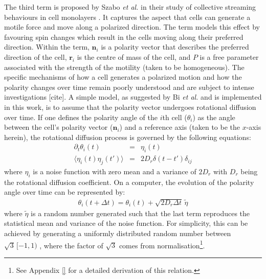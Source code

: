 \documentclass[a4paper,12pt]{article}
\begin{document}
The third term is proposed by Szabo \emph{et al.} in their study of collective streaming behaviours in cell monolayers \cite{szabo2010}. It captures the aspect that  cells can generate a motile force and move along a polarized direction. The term models this effect by favouring spin changes which result in the cells moving along their preferred direction. Within the term, $\bm{n}_i$ is a polarity vector that describes the preferred direction of the cell, $\bm{r}_i$ is the centre of mass of the cell, and $P$ is a free parameter associated with the strength of the motility (taken to be homogeneous). The specific mechanisms of how a cell generates a polarized motion and how the polarity changes over time remain poorly understood and are subject to intense investigations [cite]. A simple model, as suggested by Bi \emph{et al.} \cite{bi2015motility} and is implemented in this work, is to assume that the polarity vector undergoes rotational diffusion over time. If one defines the polarity angle of the $i$th cell ($\theta_i$) as the angle between the cell's polarity vector ($\bm{n}_i$) and a reference axis (taken to be the $x$-axis herein), the rotational diffusion process is governed by the following equations:
\begin{eqnarray}
\partial_t\theta_i(t) & = & \eta_i(t)\\
\langle{\eta_i(t)\eta_j(t')\rangle} & = & 2D_r\delta(t-t')\delta_{ij}
\end{eqnarray}
where $\eta_i$ is a noise function with zero mean and a variance of $2D_r$ with $D_r$ being the rotational diffusion coefficient. On a computer, the evolution of the polarity angle over time can be represented by:
\begin{eqnarray}
\label{eqn:computerRotateDiff}
\theta_i(t+\Delta t) = \theta_i(t) + \sqrt{2D_r\Delta t}\,\tilde\eta
\end{eqnarray}
where $\tilde\eta$ is a random number generated such that the last term reproduces the statistical mean and variance of the noise function. For simplicity, this can be achieved by generating a uniformly distributed random number between $\sqrt{3}\,[-1,1)$ , where the factor of $\sqrt{3}$ comes from normalisation\footnote{See Appendix \ref{} for a detailed derivation of this relation.}.
\end{document}
